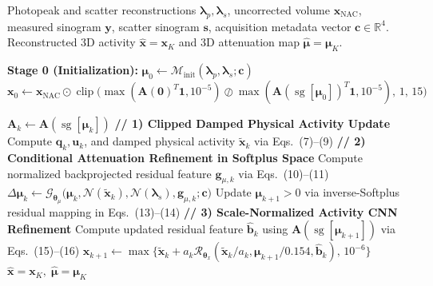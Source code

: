 \documentclass[11pt, a4paper]{article}
\begin{document}
\begin{algorithm}[t!]
\caption{\textbf{D3-JPU}: Alternating Physics-Guided CT-less SPECT Reconstruction}
\label{alg:d3_jpu}
\begin{algorithmic}[1]
\Require Photopeak and scatter reconstructions $\boldsymbol{\lambda}_p, \boldsymbol{\lambda}_s$, uncorrected volume $\mathbf{x}_{\text{NAC}}$, measured sinogram $\mathbf{y}$, scatter sinogram $\mathbf{s}$, acquisition metadata vector $\mathbf{c} \in \mathbb{R}^4$.
\Ensure Reconstructed 3D activity $\hat{\mathbf{x}} = \mathbf{x}_K$ and 3D attenuation map $\hat{\boldsymbol{\mu}} = \boldsymbol{\mu}_K$.

\vspace{0.25em}
\State \textbf{Stage 0 (Initialization):}
\State $\boldsymbol{\mu}_0 \leftarrow \mathcal{M}_{\text{init}}(\boldsymbol{\lambda}_p, \boldsymbol{\lambda}_s; \mathbf{c})$
\State $\mathbf{x}_0 \leftarrow \mathbf{x}_{\text{NAC}} \odot \operatorname{clip}\!\big(\max(\mathbf{A}(\mathbf{0})^T\mathbf{1}, 10^{-5}) \oslash \max(\mathbf{A}(\operatorname{sg}[\boldsymbol{\mu}_0])^T\mathbf{1}, 10^{-5}), \, 1, \, 15\big)$

\vspace{0.25em}
    \State $\mathbf{A}_k \leftarrow \mathbf{A}(\operatorname{sg}[\boldsymbol{\mu}_k])$ 
    \State \textbf{// 1) Clipped Damped Physical Activity Update}
    \State Compute $\mathbf{q}_k, \mathbf{u}_k$, and damped physical activity $\widetilde{\mathbf{x}}_k$ via Eqs.~(7)--(9)
    \State \textbf{// 2) Conditional Attenuation Refinement in Softplus Space}
    \State Compute normalized backprojected residual feature $\mathbf{g}_{\mu,k}$ via Eqs.~(10)--(11)
    \State $\Delta \boldsymbol{\mu}_k \leftarrow \mathcal{G}_{\boldsymbol{\theta}_\mu}\big(\boldsymbol{\mu}_k, \mathcal{N}(\widetilde{\mathbf{x}}_k), \mathcal{N}(\boldsymbol{\lambda}_s), \mathbf{g}_{\mu,k}; \mathbf{c}\big)$
    \State Update $\boldsymbol{\mu}_{k+1} > 0$ via inverse-Softplus residual mapping in Eqs.~(13)--(14)
    \State \textbf{// 3) Scale-Normalized Activity CNN Refinement}
    \State Compute updated residual feature $\widehat{\mathbf{b}}_k$ using $\mathbf{A}(\operatorname{sg}[\boldsymbol{\mu}_{k+1}])$ via Eqs.~(15)--(16)
    \State $\mathbf{x}_{k+1} \leftarrow \max\big\{\widetilde{\mathbf{x}}_k + a_k \mathcal{R}_{\boldsymbol{\theta}_x}(\widetilde{\mathbf{x}}_k / a_k, \boldsymbol{\mu}_{k+1}/0.154, \widehat{\mathbf{b}}_k), \, 10^{-6}\big\}$
\EndFor
\State \Return $\hat{\mathbf{x}} = \mathbf{x}_K, \; \hat{\boldsymbol{\mu}} = \boldsymbol{\mu}_K$
\end{algorithmic}
\end{algorithm}
\end{document}
